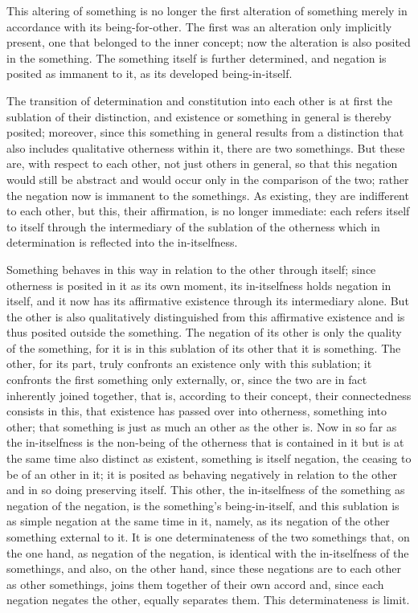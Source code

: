 This altering of something is no longer
the first alteration of something merely
in accordance with its being-for-other.
The first was an alteration only implicitly present,
one that belonged to the inner concept;
now the alteration is also posited in the something.
The something itself is further determined,
and negation is posited as immanent to it,
as its developed being-in-itself.

The transition of determination and constitution
into each other is at first the sublation of their distinction,
and existence or something in general is thereby posited;
moreover, since this something in general results
from a distinction that also includes
qualitative otherness within it,
there are two somethings.
But these are, with respect to each other,
not just others in general,
so that this negation would still be abstract
and would occur only in the comparison of the two;
rather the negation now is immanent to the somethings.
As existing, they are indifferent to each other,
but this, their affirmation, is no longer immediate:
each refers itself to itself through the intermediary of
the sublation of the otherness which in determination is
reflected into the in-itselfness.

Something behaves in this way in relation
to the other through itself;
since otherness is posited in it as its own moment,
its in-itselfness holds negation in itself,
and it now has its affirmative existence
through its intermediary alone.
But the other is also qualitatively distinguished
from this affirmative existence
and is thus posited outside the something.
The negation of its other is only
the quality of the something,
for it is in this sublation of its other that it is something.
The other, for its part,
truly confronts an existence only with this sublation;
it confronts the first something only externally,
or, since the two are in fact inherently joined together,
that is, according to their concept,
their connectedness consists in this,
that existence has passed over into otherness, something into other;
that something is just as much an other as the other is.
Now in so far as the in-itselfness is the non-being of
the otherness that is contained in it
but is at the same time also distinct as existent,
something is itself negation,
the ceasing to be of an other in it;
it is posited as behaving negatively in relation to
the other and in so doing preserving itself.
This other, the in-itselfness of
the something as negation of the negation,
is the something's being-in-itself,
and this sublation is as simple negation
at the same time in it, namely, as its negation
of the other something external to it.
It is one determinateness of the two somethings
that, on the one hand, as negation of the negation,
is identical with the in-itselfness of the somethings,
and also, on the other hand, since these negations are
to each other as other somethings,
joins them together of their own accord
and, since each negation negates the other,
equally separates them.
This determinateness is limit.

